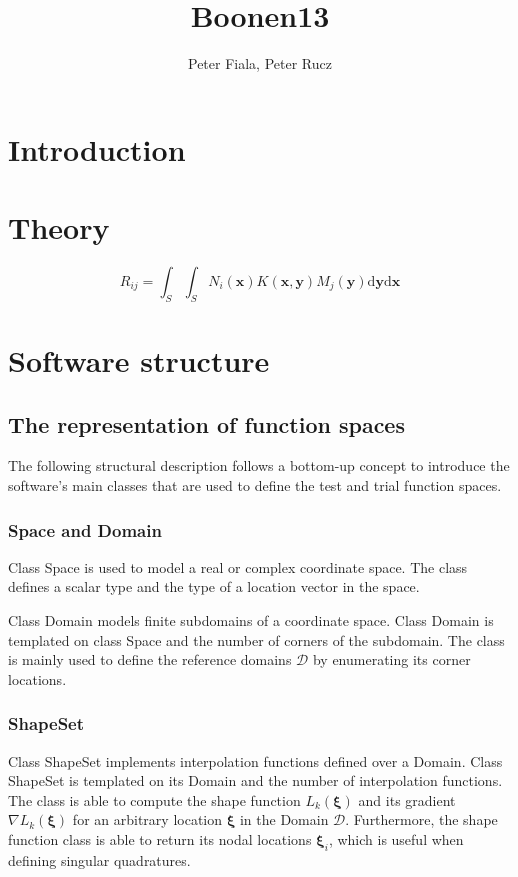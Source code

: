\documentclass[review]{elsarticle}
\title{Boonen13}
\author{Peter Fiala, Peter Rucz}
\newcommand{\td}{\mathrm{d}}
\begin{document}
\maketitle

\section{Introduction}

\section{Theory}

\begin{equation}
R_{ij} = \int_S \int_S N_i(\bm{x}) K(\bm{x},\bm{y}) M_j(\bm{y}) \td \bm{y} \td \bm{x}
\end{equation}

\section{Software structure}

\subsection{The representation of function spaces}

The following structural description follows a bottom-up concept to introduce the software's main classes that are used to define the test and trial function spaces.

\subsubsection{Space and Domain}

Class Space is used to model a real or complex coordinate space.
The class defines a scalar type and the type of a location vector in the space.

Class Domain models finite subdomains of a coordinate space.
Class Domain is templated on class Space and the number of corners of the subdomain.
The class is mainly used to define the reference domains $\mathcal{D}$ by enumerating its corner locations.

\subsubsection{ShapeSet}

Class ShapeSet implements interpolation functions defined over a Domain.
Class ShapeSet is templated on its Domain and the number of interpolation functions.
The class is able to compute the shape function $L_k(\bm{\xi})$ and its gradient $\nabla L_k(\bm{\xi})$ for an arbitrary location $\bm{\xi}$ in the Domain $\mathcal{D}$.
Furthermore, the shape function class is able to return its nodal locations $\bm{\xi}_i$, which is useful when defining singular quadratures.
\end{document}
